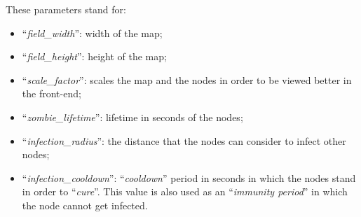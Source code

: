 \documentclass[conference]{IEEEtran}
\begin{document}
	These parameters stand for:
	\begin{itemize}
		\item ``\textit{field\_width}'': width of the map;
		\item ``\textit{field\_height}'': height of the map;
		\item ``\textit{scale\_factor}'': scales the map and the nodes in order to be viewed better in the front-end;
		\item ``\textit{zombie\_lifetime}'': lifetime in seconds of the nodes;
		\item ``\textit{infection\_radius}'': the distance that the nodes can consider to infect other nodes;
		\item ``\textit{infection\_cooldown}'': ``\textit{cooldown}'' period in seconds in which the nodes stand in order to ``\textit{cure}''. This value is also used as an ``\textit{immunity period}'' in which the node cannot get infected.
	\end{itemize}
	
\end{document}
